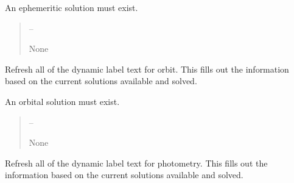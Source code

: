 \documentclass[letterpaper,11pt,english]{sphinxmanual}
\begin{document}
\begin{savenotes}
\begin{fulllineitems}
\begin{savenotes}
\begin{fulllineitems}
\sphinxAtStartPar
An ephemeritic solution must exist.
\begin{quote}\begin{description}
\sphinxAtStartPar
{} – 

\sphinxAtStartPar
None

\end{description}\end{quote}

\end{fulllineitems}\end{savenotes}


\begin{savenotes}\begin{fulllineitems}
\label{\detokenize{code/opihiexarata.gui.manual:opihiexarata.gui.manual.OpihiManualWindow.__refresh_dynamic_label_text_orbit}}
\pysigstartsignatures
{}
\pysigstopsignatures
\sphinxAtStartPar
Refresh all of the dynamic label text for orbit.
This fills out the information based on the current solutions
available and solved.

\sphinxAtStartPar
An orbital solution must exist.
\begin{quote}\begin{description}
\sphinxAtStartPar
{} – 

\sphinxAtStartPar
None

\end{description}\end{quote}

\end{fulllineitems}\end{savenotes}


\begin{savenotes}\begin{fulllineitems}
\label{\detokenize{code/opihiexarata.gui.manual:opihiexarata.gui.manual.OpihiManualWindow.__refresh_dynamic_label_text_photometry}}
\pysigstartsignatures
{}
\pysigstopsignatures
\sphinxAtStartPar
Refresh all of the dynamic label text for photometry.
This fills out the information based on the current solutions
available and solved.


\end{fulllineitems}
\end{savenotes}
\end{fulllineitems}
\end{savenotes}
\end{document}
